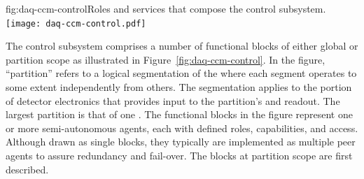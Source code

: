 
\begin{dunefigure}{fig:daq-ccm-control}{Roles and services that compose the  control subsystem.}
  \texttt{[image: daq-ccm-control.pdf]}
\end{dunefigure}

The control subsystem comprises a number of functional blocks of either global or partition scope as illustrated in Figure~\ref{fig:daq-ccm-control}. 
In the figure, ``partition'' refers to a logical segmentation of the  where each segment operates to some extent independently from others. 
The segmentation applies to the portion of detector electronics that provides input to the partition's  and readout. 
The largest partition %
is that of one . 
The functional blocks in the figure represent one or more semi-autonomous agents, each with defined roles, capabilities, and access. 
Although drawn as single blocks, they typically are implemented as multiple peer agents to assure redundancy and fail-over. 
The blocks at partition scope are first described.

